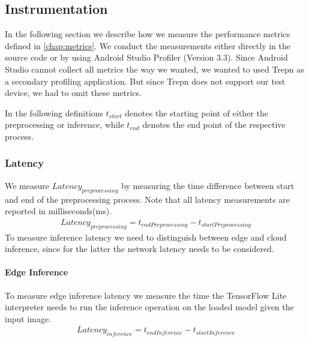 \subsection{Instrumentation}
\label{chap:insta_measurements}
In the following section we describe how we measure the performance metrics defined in \ref{chap:metrics}.
We conduct the measurements either directly in the source code or by using Android Studio Profiler (Version 3.3). Since Android Studio cannot collect all metrics the way we wanted, we wanted to used Trepn as a secondary profiling application. But since Trepn does not support our test device, we had to omit these metrics.

In the following definitions $t_{start}$ denotes the starting point of either the preprocessing or inference, while $t_{end}$ denotes the end point of the respective process.
\subsubsection{Latency}
We measure $Latency_{preprocessing}$ by measuring the time difference between start and end of the preprocessing process.
Note that all latency measurements are reported in milliseconds(ms).
\begin{equation*}
\begin{gathered}
Latency_{preprocessing} = t_{endPreprocessing} - t_{startPreprocessing}
\end{gathered}
\end{equation*}
To measure inference latency we need to distinguish between edge and cloud inference, since for the latter the network latency needs to be considered.

\paragraph{Edge Inference}To measure edge inference latency we measure the time the TensorFlow Lite interpreter needs to run the inference operation on the loaded model given the input image.
\begin{equation*}
\begin{gathered}
Latency_{inference} = t_{endInference} - t_{startInference}
\end{gathered}
\end{equation*}
